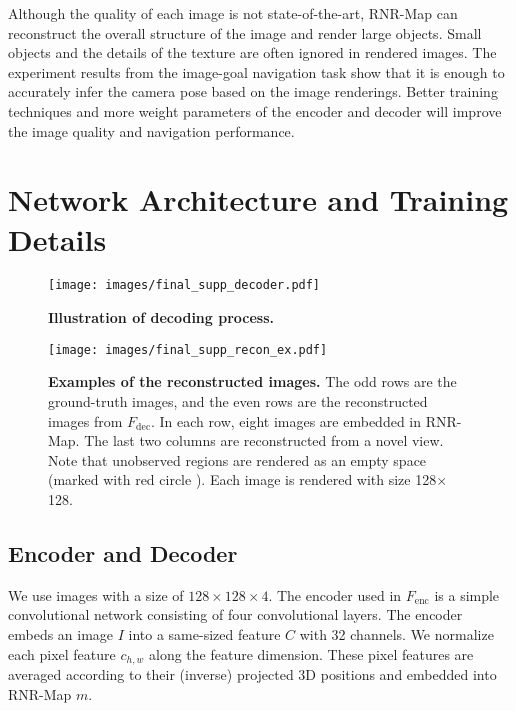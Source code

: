 \documentclass[10pt,twocolumn,letterpaper]{article}
\newcommand{\emptycircle}{\ding{109}}%
\begin{document}
Although the quality of each image is not state-of-the-art, RNR-Map can reconstruct the overall structure of the image and render large objects.
%
Small objects and the details of the texture are often ignored in rendered images.
%
The experiment results from the image-goal navigation task show that it is enough to accurately infer the camera pose based on the image renderings.
%
Better training techniques and more weight parameters of the encoder and decoder will improve the image quality and navigation performance.



\section{Network Architecture and Training Details}\label{appendix:implementation_details}


\begin{figure}[t]
  \centering
  \texttt{[image: images/final\_supp\_decoder.pdf]}
  \caption{\textbf{Illustration of decoding process.}}
\label{fig:supp:decoder}
\end{figure}


\begin{figure*}[t]
  \centering
  \texttt{[image: images/final\_supp\_recon\_ex.pdf]}
  \caption{\textbf{Examples of the reconstructed images.} The odd rows are the ground-truth images, and the even rows are the reconstructed images from $F_\mathrm{dec}$. In each row, eight images are embedded in RNR-Map. The last two columns are reconstructed from a novel view. Note that unobserved regions are rendered as an empty space (marked with red circle {\color{RubineRed}\emptycircle}). Each image is rendered with size 128$\times$128.}   
\label{fig:sup:recon_ex}
\end{figure*}


\subsection{Encoder and Decoder}\label{appendix:network_autoenc}
We use images with a size of $128\times128\times4$.
%
The encoder used in $F_\mathrm{enc}$ is a simple convolutional network consisting of four convolutional layers. 
%
The encoder embeds an image $I$ into a same-sized feature $C$ with 32 channels.
%
We normalize each pixel feature $c_{h,w}$ along the feature dimension.
%
These pixel features are averaged according to their (inverse) projected 3D positions and embedded into RNR-Map $m$.
%
\end{document}
